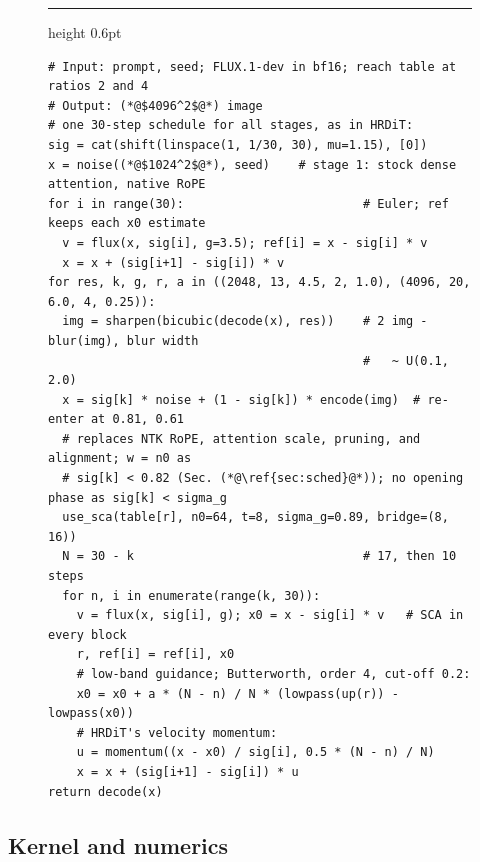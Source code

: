 \begin{figure}[!htbp]
\noindent\begin{minipage}{\linewidth}
    \hrule height 0.6pt\vspace{2pt}
    \label{alg:prog}
    \vspace{-4pt}
\begin{lstlisting}[style=scacode, basicstyle=\fontfamily{lmtt}\fontsize{8}{9}\selectfont, emph={shift,linspace,noise,flux,decode,encode,bicubic,sharpen,lowpass,up,momentum,use_sca}]
# Input: prompt, seed; FLUX.1-dev in bf16; reach table at ratios 2 and 4
# Output: (*@$4096^2$@*) image
# one 30-step schedule for all stages, as in HRDiT:
sig = cat(shift(linspace(1, 1/30, 30), mu=1.15), [0])
x = noise((*@$1024^2$@*), seed)    # stage 1: stock dense attention, native RoPE
for i in range(30):                         # Euler; ref keeps each x0 estimate
  v = flux(x, sig[i], g=3.5); ref[i] = x - sig[i] * v
  x = x + (sig[i+1] - sig[i]) * v
for res, k, g, r, a in ((2048, 13, 4.5, 2, 1.0), (4096, 20, 6.0, 4, 0.25)):
  img = sharpen(bicubic(decode(x), res))    # 2 img - blur(img), blur width
                                            #   ~ U(0.1, 2.0)
  x = sig[k] * noise + (1 - sig[k]) * encode(img)  # re-enter at 0.81, 0.61
  # replaces NTK RoPE, attention scale, pruning, and alignment; w = n0 as
  # sig[k] < 0.82 (Sec. (*@\ref{sec:sched}@*)); no opening phase as sig[k] < sigma_g
  use_sca(table[r], n0=64, t=8, sigma_g=0.89, bridge=(8, 16))
  N = 30 - k                                # 17, then 10 steps
  for n, i in enumerate(range(k, 30)):
    v = flux(x, sig[i], g); x0 = x - sig[i] * v   # SCA in every block
    r, ref[i] = ref[i], x0
    # low-band guidance; Butterworth, order 4, cut-off 0.2:
    x0 = x0 + a * (N - n) / N * (lowpass(up(r)) - lowpass(x0))
    # HRDiT's velocity momentum:
    u = momentum((x - x0) / sig[i], 0.5 * (N - n) / N)
    x = x + (sig[i+1] - sig[i]) * u
return decode(x)
\end{lstlisting}
\end{minipage}
\end{figure}

\subsection{Kernel and numerics}
\label{app:kernel}

